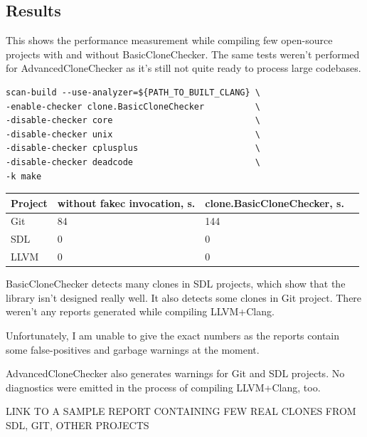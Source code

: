 \documentclass[a0,portrait]{a0poster}
\begin{document}
\begin{multicols}{2}
\section*{Results}

This shows the performance measurement while compiling few open-source projects with and without
BasicCloneChecker. The same tests weren't performed for AdvancedCloneChecker as it's still not
quite ready to process large codebases.

\begin{lstlisting}[frame=single]
scan-build --use-analyzer=${PATH_TO_BUILT_CLANG} \
-enable-checker clone.BasicCloneChecker          \
-disable-checker core                            \
-disable-checker unix                            \
-disable-checker cplusplus                       \
-disable-checker deadcode                        \
-k make
\end{lstlisting}

\begin{center}\vspace{1cm}
\begin{tabular}{l l l l}
\toprule
\textbf{Project} & \textbf{without fakec invocation, s.} & \textbf{clone.BasicCloneChecker, s.}\\
\midrule
Git &  84 & 144 \\
SDL &  0  & 0   \\
LLVM & 0  & 0   \\
\bottomrule
\end{tabular}
\end{center}\vspace{1cm}

BasicCloneChecker detects many clones in SDL projects, which show that the library isn't designed
really well. It also detects some clones in Git project. There weren't any reports generated while
compiling LLVM+Clang.

Unfortunately, I am unable to give the exact numbers as the reports contain some false-positives
and garbage warnings at the moment.

AdvancedCloneChecker also generates warnings for Git and SDL projects. No diagnostics were emitted
in the process of compiling LLVM+Clang, too.

LINK TO A SAMPLE REPORT CONTAINING FEW REAL CLONES FROM SDL, GIT, OTHER PROJECTS



\end{multicols}
\end{document}
